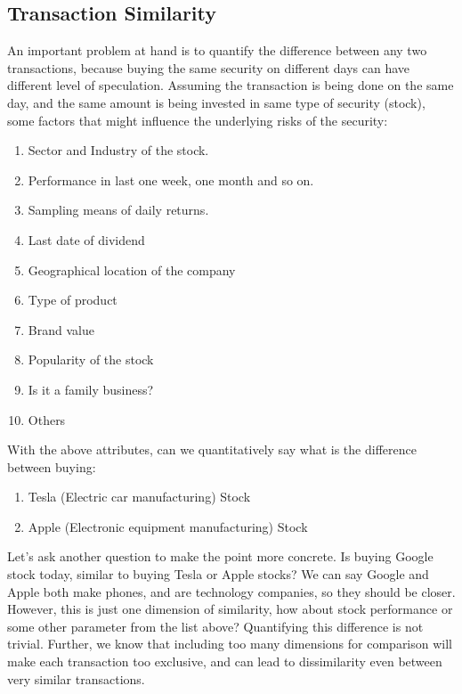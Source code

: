 \documentclass[a4paper]{article}
\begin{document}
\subsection{Transaction Similarity}
An important problem at hand is to quantify the difference between any two transactions, because buying the same security on different days can have different level of speculation. Assuming the transaction is being done on the same day, and the same amount is being invested in same type of security (stock), some factors that might influence the underlying risks of the security:
\begin{enumerate}
    \item Sector and Industry of the stock.
    \item Performance in last one week, one month and so on.
    \item Sampling means of daily returns.
    \item Last date of dividend
    \item Geographical location of the company
    \item Type of product
    \item Brand value
    \item Popularity of the stock
    \item Is it a family business?
    \item Others
\end{enumerate}

With the above attributes, can we quantitatively say what is the difference between buying:
\begin{enumerate}
    \item Tesla (Electric car manufacturing) Stock
    \item Apple (Electronic equipment manufacturing) Stock 
\end{enumerate}


Let's ask another question to make the point more concrete. Is buying Google stock today, similar to buying Tesla or Apple stocks? We can say Google and Apple both make phones, and are technology companies, so they should be closer. However, this is just one dimension of similarity, how about stock performance or some other parameter from the list above? Quantifying this difference is not trivial. Further, we know that including too many dimensions for comparison will make each transaction too exclusive, and can lead to dissimilarity even between very similar transactions. 
\end{document}
